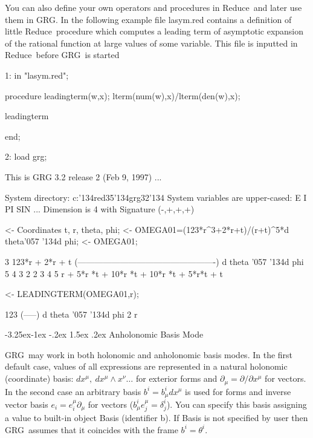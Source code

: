 \documentclass[twoside,openright]{report}
\makeatletter
\newcommand{\grgtt}{\ttfamily}
\renewcommand{\tt}{\grgtt}
\newcommand{\w}{{\tt \char'057 \char'134}}  %
\newcommand{\bs}{{\tt \char'134}}           %
\newcommand{\grg}{{\sc GRG}}
\newcommand{\reduce}{{\sc Reduce}}
\newcommand{\file}[1]{{\sf#1}}
\renewcommand\subsection{\@startsection{subsection}{2}{\z@}%
                                     {-3.25ex\@plus -1ex \@minus -.2ex}%
                                     {1.5ex \@plus .2ex}%
                                     {\normalfont\large\slshape\bfseries}}
\makeatother
\begin{document}
You can also define your own operators and procedures
in \reduce\ and later use them in \grg.
In the following example file \file{lasym.red} contains
a definition of little \reduce\ procedure
which computes a leading term of asymptotic expansion
of the rational function at large values of some
variable. This file is inputted in \reduce\ before
\grg\ is started
\begin{slisting}

1: in "lasym.red";

procedure leadingterm(w,x);
  lterm(num(w),x)/lterm(den(w),x);

leadingterm

end;

2: load grg;

This is GRG 3.2 release 2 (Feb 9, 1997) ...

System directory: c:{\bs}red35{\bs}grg32{\bs}
System variables are upper-cased: E I PI SIN ...
Dimension is 4 with Signature (-,+,+,+)

<- Coordinates t, r, theta, phi;
<- OMEGA01=(123*r^3+2*r+t)/(r+t)^5*d theta{\w}d phi;
<- OMEGA01;

                      3
                 123*r  + 2*r + t
(-------------------------------------------------) d theta \w d phi
   5      4         3  2       2  3        4    5
  r  + 5*r *t + 10*r *t  + 10*r *t  + 5*r*t  + t

<- LEADINGTERM(OMEGA01,r);

  123
(-----) d theta \w d phi
   2
  r
\end{slisting}


\subsection{Anholonomic Basis Mode}
\label{amode}

\grg\ may work in both holonomic and anholonomic basis modes.
In the first default case, values of all expressions are
represented in a natural holonomic (coordinate) basis:
$d  x^\mu,~d  x^\mu\wedge  x^\nu\dots$ for exterior
forms and $\partial_\mu=\partial/\partial x^\mu$
for vectors. In the second case an
arbitrary basis $b^i=b^i_\mu d  x^\mu$ is used for
forms and inverse vector basis $e_i=e_i^\mu\partial_\mu$ for vectors
($b^i_\mu e^\mu_j=\delta^i_j$). You can specify this basis
assigning a value to built-in object
{\tt Basis} (identifier {\tt b}). If {\tt Basis} is not
specified by user then \grg\ assumes that it coincides
with the frame $b^i=\theta^i$.
\end{document}
